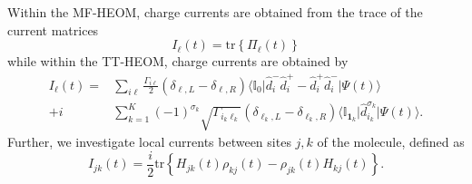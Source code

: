 \documentclass{article}
\newcommand{\dif}{\mathrm{d}}
\renewcommand{\vec}[1]{\mathbf{#1}}
\newcommand{\pdagger}{{\phantom{\dagger}}}
\newcommand{\tr}[1]{\mathrm{tr}\left\{#1\right\}}
\newcommand{\expc}[3]{\langle #1\vert #2 \vert #3\rangle}
\begin{document}
Within the MF-HEOM, charge currents are obtained from the trace of the current matrices 
\begin{equation}
	I_\ell(t) = \tr{\Pi_\ell(t)}
\end{equation}
while within the TT-HEOM, charge currents are obtained by \cite{ke2022hierarchical}
\begin{equation}
	\begin{split}
		I_\ell(t) = &\sum_{i\ell} \frac{\Gamma_{i\ell}}{2}(\delta_{\ell, L}- \delta_{\ell, R}) \expc{\mathbb{I}_0}{\hat{d}_i^-\hat{d}_i^+ - \hat{d}_i^+\hat{d}_i^- }{\Psi(t)} \\ + i & \sum_{k=1}^K (-1)^{\sigma_k }\sqrt{\Gamma_{i_k\ell_k}}(\delta_{\ell_k,L}- \delta_{\ell_k,R})\expc{\mathbb{I}_{\bm{1}_k}}{\hat{d}_{i_k}^{\sigma_k}}{\Psi(t)}.
	\end{split}
\end{equation}
Further, we investigate local currents between sites $j,k$ of the molecule, defined as
\begin{equation}
	I_{jk}(t) =\frac{i}{2} \tr{H_{jk}(t)\rho_{kj}(t)-\rho_{jk}(t)H_{kj}(t)}.
\end{equation}
\newpage
\end{document}
